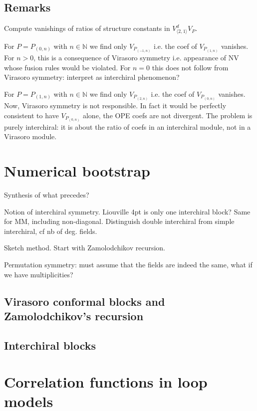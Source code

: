 \documentclass[12pt, a4paper]{article}
\theoremstyle{break}
\begin{document}
\subsection{Remarks}

Compute vanishings of ratios of structure constants in $V^d_{\langle 2,1\rangle}V_P$. 

For $P=P_{(0,n)}$ with $n\in\mathbb{N}$ we find only $V_{P_{(-1,n)}}$ i.e. the coef of $V_{P_{(1,n)}}$ vanishes. For $n>0$, this is a consequence of Virasoro symmetry i.e. appearance of NV whose fusion rules would be violated. For $n=0$ this does not follow from Virasoro symmetry: interpret as interchiral phenomenon?

For $P=P_{(1,n)}$ with $n\in\mathbb{N}$ we find only $V_{P_{(2,n)}}$ i.e. the coef of $V_{P_{(0,n)}}$ vanishes. Now, Virasoro symmetry is not responsible. In fact it would be perfectly consistent to have $V_{P_{(0,n)}}$ alone, the OPE coefs are not divergent. The problem is purely interchiral: it is about the ratio of coefs in an interchiral module, not in a Virasoro module. 

\section{Numerical bootstrap}

Synthesis of what precedes?

Notion of interchiral symmetry. Liouville 4pt is only one interchiral block? Same for MM, including non-diagonal. Distinguish double interchiral from simple interchiral, cf nb of deg. fields. 

Sketch method. Start with Zamolodchikov recursion.

Permutation symmetry: must assume that the fields are indeed the same, what if we have multiplicities? 

\subsection{Virasoro conformal blocks and Zamolodchikov's recursion}

\subsection{Interchiral blocks} \label{sec:icb}

\section{Correlation functions in loop models} \label{sec:cloop}
\end{document}
